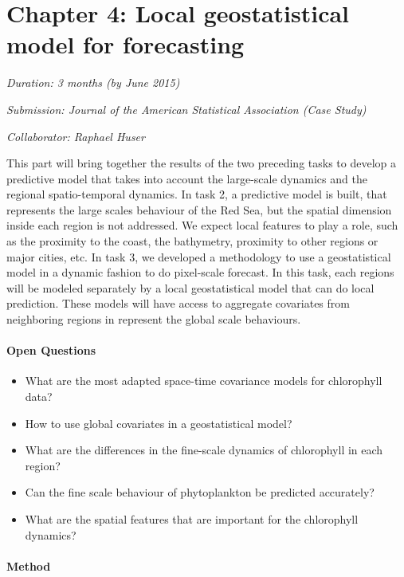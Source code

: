 \section{Chapter 4: Local geostatistical model for forecasting}

\noindent
\emph{Duration: 3 months (by June 2015)}

\noindent
\emph{Submission: Journal of the American Statistical Association (Case Study)}

\noindent
\emph{Collaborator: Raphael Huser}

This part will bring together the results of the two preceding tasks to develop a predictive model that takes into account the large-scale dynamics and the regional spatio-temporal dynamics. In task 2, a predictive model is built, that represents the large scales behaviour of the Red Sea, but the spatial dimension inside each region is not addressed. We expect local features to play a role, such as the proximity to the coast, the bathymetry, proximity to other regions or major cities, etc. In task 3, we developed a methodology to use a geostatistical model in a dynamic fashion to do pixel-scale forecast. In this task, each regions will be modeled separately by a local geostatistical model that can do local prediction. These models will have access to aggregate covariates from neighboring regions in represent the global scale behaviours. 

\paragraph{Open Questions}

\begin{itemize}
\item What are the most adapted space-time covariance models for chlorophyll data?
\item How to use global covariates in a geostatistical model?
\item What are the differences in the fine-scale dynamics of chlorophyll in each region?
\item Can the fine scale behaviour of phytoplankton be predicted accurately?
\item What are the spatial features that are important for the chlorophyll dynamics?
\end{itemize}

\paragraph{Method}

